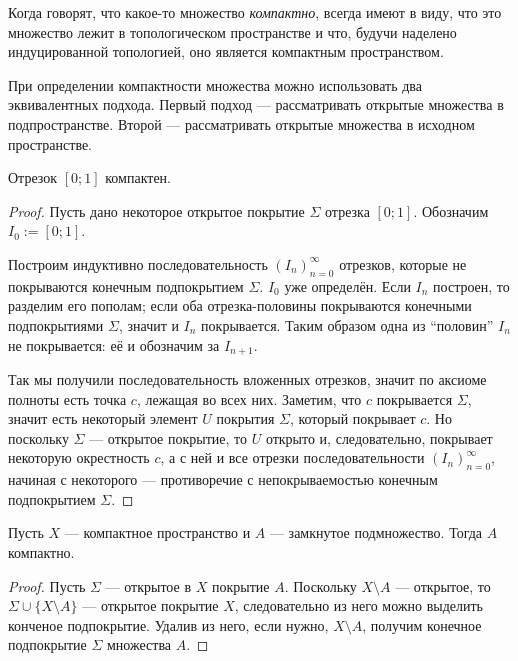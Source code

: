 \documentclass[12pt,a4paper]{article}
\begin{document}
    \begin{remark*}
        Когда говорят, что какое-то множество \emph{компактно}, всегда имеют в виду, что это множество лежит в топологическом пространстве и что, будучи наделено индуцированной топологией, оно является компактным пространством.
    \end{remark*}

    \begin{remark*}
        При определении компактности множества можно использовать два эквивалентных подхода. Первый подход --- рассматривать открытые множества в подпространстве. Второй --- рассматривать открытые множества в исходном пространстве.
    \end{remark*}

    \begin{theorem}
        Отрезок $[0; 1]$ компактен.
    \end{theorem}

    \begin{proof}
        Пусть дано некоторое открытое покрытие $\Sigma$ отрезка $[0; 1]$. Обозначим $I_0 := [0; 1]$.

        Построим индуктивно последовательность $(I_n)_{n=0}^\infty$ отрезков, которые не покрываются конечным подпокрытием $\Sigma$. $I_0$ уже определён. Если $I_n$ построен, то разделим его пополам; если оба отрезка-половины покрываются конечными подпокрытиями $\Sigma$, значит и $I_n$ покрывается. Таким образом одна из ``половин'' $I_n$ не покрывается: её и обозначим за $I_{n+1}$.

        Так мы получили последовательность вложенных отрезков, значит по аксиоме полноты есть точка $c$, лежащая во всех них. Заметим, что $c$ покрывается $\Sigma$, значит есть некоторый элемент $U$ покрытия $\Sigma$, который покрывает $c$. Но поскольку $\Sigma$ --- открытое покрытие, то $U$ открыто и, следовательно, покрывает некоторую окрестность $c$, а с ней и все отрезки последовательности $(I_n)_{n=0}^\infty$, начиная с некоторого --- противоречие с непокрываемостью конечным подпокрытием $\Sigma$.
    \end{proof}

    \begin{theorem}
        Пусть $X$ --- компактное пространство и $A$ --- замкнутое подмножество. Тогда $A$ компактно.
    \end{theorem}

    \begin{proof}
        Пусть $\Sigma$ --- открытое в $X$ покрытие $A$. Поскольку $X \setminus A$ --- открытое, то $\Sigma \cup \{X \setminus A\}$ --- открытое покрытие $X$, следовательно из него можно выделить конченое подпокрытие. Удалив из него, если нужно, $X \setminus A$, получим конечное подпокрытие $\Sigma$ множества $A$.
    \end{proof}
\end{document}

